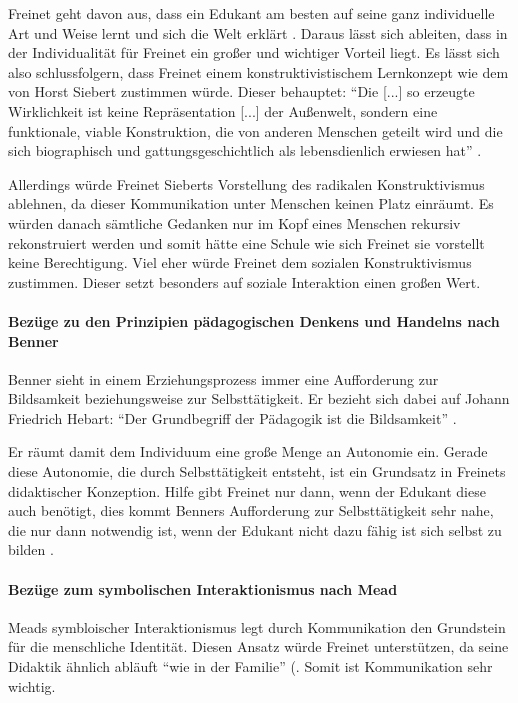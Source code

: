 Freinet geht davon aus, dass ein Edukant am besten auf seine ganz individuelle Art und Weise lernt und sich die Welt erklärt \parencite[vgl.][~496]{Freinet-2000a}.
Daraus lässt sich ableiten, dass in der Individualität für Freinet ein großer und wichtiger Vorteil liegt.
Es lässt sich also schlussfolgern, dass Freinet einem konstruktivistischem Lernkonzept wie dem von Horst Siebert zustimmen würde.
Dieser behauptet: ``Die [...] so erzeugte Wirklichkeit ist keine Repräsentation [...] der Außenwelt, sondern eine funktionale, viable Konstruktion, die von anderen Menschen geteilt wird und die sich biographisch und gattungsgeschichtlich als lebensdienlich erwiesen hat'' \parencite[~6]{siebert-2003}.

Allerdings würde Freinet Sieberts Vorstellung des radikalen Konstruktivismus ablehnen, da dieser Kommunikation unter Menschen keinen Platz einräumt.
Es würden danach sämtliche Gedanken nur im Kopf eines Menschen rekursiv rekonstruiert werden \parencite[vgl.][~10]{siebert-2003} und somit hätte eine Schule wie sich Freinet sie vorstellt keine Berechtigung.
Viel eher würde Freinet dem sozialen Konstruktivismus zustimmen.
Dieser setzt besonders auf soziale Interaktion einen großen Wert.

\paragraph{Bezüge zu den Prinzipien pädagogischen Denkens und Handelns nach Benner}

Benner sieht in einem Erziehungsprozess immer eine Aufforderung zur Bildsamkeit beziehungsweise zur Selbsttätigkeit.
Er bezieht sich dabei auf Johann Friedrich Hebart:
``Der Grundbegriff der Pädagogik ist die Bildsamkeit'' \parencite[~70]{benner-2012}.

Er räumt damit dem Individuum eine große Menge an Autonomie ein.
Gerade diese Autonomie, die durch Selbsttätigkeit entsteht, ist ein Grundsatz in Freinets didaktischer Konzeption.
Hilfe gibt Freinet nur dann, wenn der Edukant diese auch benötigt, dies kommt Benners Aufforderung zur Selbsttätigkeit sehr nahe, die nur dann notwendig ist, wenn der Edukant nicht dazu fähig ist sich selbst zu bilden \parencite[vgl.][~91]{benner-2012}.

\paragraph{Bezüge zum symbolischen Interaktionismus nach Mead}

Meads symbloischer Interaktionismus legt durch Kommunikation den Grundstein für die menschliche Identität.
Diesen Ansatz würde Freinet unterstützen, da seine Didaktik ähnlich abläuft ``wie in der Familie'' \parencite[~109]{Freinet1979}(.
Somit ist Kommunikation sehr wichtig.

